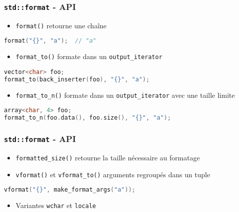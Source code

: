 \documentclass[C++.tex]{subfiles}
\begin{document}
\begin{frame}[fragile]
	\frametitle{\lstinline|std::format| - API}
	\begin{itemize}
		\item \lstinline|format()| retourne une chaîne
	\end{itemize}

	\begin{lstlisting}[language=C++]
format("{}", "a"); 	// "a"\end{lstlisting}

	\begin{itemize}
		\item \lstinline|format_to()| formate dans un \lstinline|output_iterator|
	\end{itemize}

	\begin{lstlisting}[language=C++]
vector<char> foo;
format_to(back_inserter(foo), "{}", "a");\end{lstlisting}


	\begin{itemize}
		\item \lstinline|format_to_n()| formate dans un \lstinline|output_iterator| avec une taille limite
	\end{itemize}

	\begin{lstlisting}[language=C++]
array<char, 4> foo;
format_to_n(foo.data(), foo.size(), "{}", "a");\end{lstlisting}

\end{frame}

\begin{frame}[fragile]
	\frametitle{\lstinline|std::format| - API}
	\begin{itemize}
		\item \lstinline|formatted_size()| retourne la taille nécessaire au formatage
		\item \lstinline|vformat()| et \lstinline|vformat_to()| arguments regroupés dans un \og tuple\fg{}
	\end{itemize}

	\begin{lstlisting}[language=C++]
vformat("{}", make_format_args("a"));\end{lstlisting}

	\begin{itemize}
		\item Variantes \lstinline|wchar| et \lstinline|locale|
	\end{itemize}
\end{frame}
\end{document}
